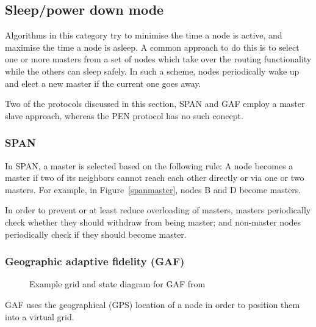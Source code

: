 \subsection{Sleep/power­ down mode}\label{sleep}
Algorithms in this category try to minimise the time a node is active, and
maximise the time a node is asleep. A common approach to do this is to select
one or more masters from a set of nodes which take over the routing functionality
while the others can sleep safely. In such a scheme, nodes periodically wake up
and elect a new master if the current one goes away.

Two of the protocols discussed in this section, SPAN and GAF employ a master
slave approach, whereas the PEN protocol has no such concept.

\subsubsection{SPAN}\label{span}
In SPAN\cite{chen2002span}, a master is selected based on the following rule:
A node becomes a master if two of its neighbors cannot reach each other directly
or via one or two masters. For example, in Figure~\ref{spanmaster}, nodes B and
D become masters.

In order to prevent or at least reduce overloading of masters, masters periodically
check whether they should withdraw from being master; and non-master nodes
periodically check if they should become master.


\subsubsection{Geographic adaptive fidelity (GAF)}
\label{gaf}
\begin{figure}[!t]
\hfill
{}
\caption{Example grid and state diagram for GAF from \cite{alotaibi2012survey}}
\end{figure}
GAF\cite{xu2001geography} uses the geographical (GPS) location of a node in
order to position them into a virtual grid.

